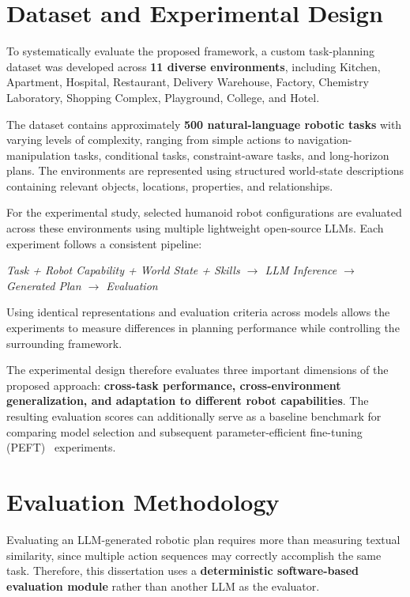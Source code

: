\documentclass[12pt,a4paper]{article}
\begin{document}
\section{Dataset and Experimental Design}

To systematically evaluate the proposed framework, a custom task-planning dataset was developed across \textbf{11 diverse environments}, including Kitchen, Apartment, Hospital, Restaurant, Delivery Warehouse, Factory, Chemistry Laboratory, Shopping Complex, Playground, College, and Hotel.

The dataset contains approximately \textbf{500 natural-language robotic tasks} with varying levels of complexity, ranging from simple actions to navigation-manipulation tasks, conditional tasks, constraint-aware tasks, and long-horizon plans.
The environments are represented using structured world-state descriptions containing relevant objects, locations, properties, and relationships.

For the experimental study, selected humanoid robot configurations are evaluated across these environments using multiple lightweight open-source LLMs.
Each experiment follows a consistent pipeline:

\begin{center}
\textit{Task + Robot Capability + World State + Skills $\rightarrow$ LLM Inference $\rightarrow$ Generated Plan $\rightarrow$ Evaluation}
\end{center}

Using identical representations and evaluation criteria across models allows the experiments to measure differences in planning performance while controlling the surrounding framework.

The experimental design therefore evaluates three important dimensions of the proposed approach:
\textbf{cross-task performance, cross-environment generalization, and adaptation to different robot capabilities}.
The resulting evaluation scores can additionally serve as a baseline benchmark for comparing model selection and subsequent parameter-efficient fine-tuning (PEFT)~\cite{peft} experiments.

\section{Evaluation Methodology}

Evaluating an LLM-generated robotic plan requires more than measuring textual similarity, since multiple action sequences may correctly accomplish the same task.
Therefore, this dissertation uses a \textbf{deterministic software-based evaluation module} rather than another LLM as the evaluator.
\end{document}
